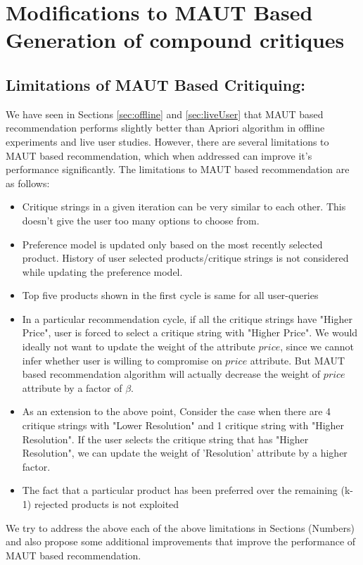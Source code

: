 \chapter{Modifications to MAUT Based Generation of compound critiques}
\label{chap:modifications}
\section{Limitations of MAUT Based Critiquing:}

We have seen in Sections \ref{sec:offline} and \ref{sec:liveUser} that MAUT based recommendation performs slightly better than Apriori algorithm in offline experiments and live user studies.
However, there are several limitations to MAUT based recommendation, which when addressed can improve it's performance significantly.
The limitations to MAUT based recommendation are as follows:
\begin{itemize}
\setlength{\itemsep}{5pt}
\item Critique strings in a given iteration can be very similar to each other. This doesn't give the user too many options to choose from.
\item Preference model is updated only based on the most recently selected product. History of user selected products/critique strings is not considered while updating the preference model.
\item Top five products shown in the first cycle is same for all user-queries
\item In a particular recommendation cycle, if all the critique strings have "Higher Price", user is forced to select a critique string with "Higher Price". We would ideally not want to update the weight of the attribute $price$, since we cannot infer whether user is willing to compromise on $price$ attribute. But MAUT based recommendation algorithm will actually decrease the weight of $price$ attribute by a factor of $\beta$.
\item As an extension to the above point, Consider the case when there are 4 critique strings with "Lower Resolution" and 1 critique string with "Higher Resolution". If the user selects the critique string that has "Higher Resolution", we can update  the weight of 'Resolution' attribute by a higher factor.
\item The fact that a particular product has been preferred over the remaining (k-1) rejected products is not exploited

\end{itemize}
We try to address the above each of the above limitations in Sections (Numbers) and also propose some additional improvements that improve the performance of MAUT based recommendation.









